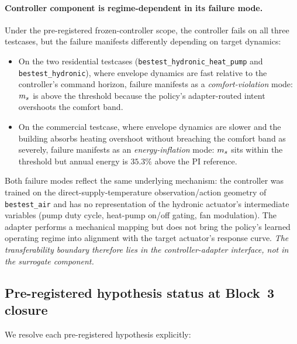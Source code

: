 \paragraph{Controller component is regime-dependent in its failure mode.}
Under the pre-registered frozen-controller scope, the controller fails on
all three testcases, but the failure manifests differently depending on
target dynamics:

\begin{itemize}
    \item On the two residential testcases
    (\texttt{bestest\_hydronic\_heat\_pump} and \texttt{bestest\_hydronic}),
    where envelope dynamics are fast relative to the controller's command
    horizon, failure manifests as a \emph{comfort-violation} mode:
    \(m_s\) is above the threshold because the policy's adapter-routed
    intent overshoots the comfort band.
    \item On the commercial testcase, where envelope dynamics are slower
    and the building absorbs heating overshoot without breaching the
    comfort band as severely, failure manifests as an
    \emph{energy-inflation} mode: \(m_s\) sits within the threshold
    but annual energy is $35.3\%$ above the PI reference.
\end{itemize}

Both failure modes reflect the same underlying mechanism: the controller
was trained on the direct-supply-temperature observation/action geometry
of \texttt{bestest\_air} and has no representation of the hydronic
actuator's intermediate variables (pump duty cycle, heat-pump on/off
gating, fan modulation). The adapter performs a mechanical mapping but
does not bring the policy's learned operating regime into alignment with
the target actuator's response curve. \emph{The transferability boundary
therefore lies in the controller-adapter interface, not in the surrogate
component.}

\subsection{Pre-registered hypothesis status at Block~3 closure}
\label{ssec:res3_hypotheses}

We resolve each pre-registered hypothesis explicitly:

